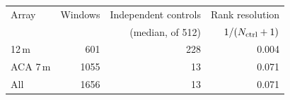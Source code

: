 \begin{tabular}{@{}lrrr@{}}
\toprule
Array & Windows & Independent controls & Rank resolution \\
 & & (median, of 512) & $1/(N_{\rm ctrl}+1)$ \\
\midrule
12\,m & 601 & 228 & 0.004 \\
ACA 7\,m & 1055 & 13 & 0.071 \\
\midrule
All & 1656 & 13 & 0.071 \\
\bottomrule
\end{tabular}
